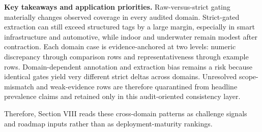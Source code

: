 \textbf{Key takeaways and application priorities.} Raw-versus-strict gating materially changes observed coverage in every audited domain. Strict-gated extraction can still exceed structured tags by a large margin, especially in smart infrastructure and automotive, while indoor and underwater remain modest after contraction. Each domain case is evidence-anchored at two levels: numeric discrepancy through comparison rows and representativeness through example rows. Domain-dependent annotation and extraction bias remains a risk because identical gates yield very different strict deltas across domains. Unresolved scope-mismatch and weak-evidence rows are therefore quarantined from headline prevalence claims and retained only in this audit-oriented consistency layer.

Therefore, Section VIII reads these cross-domain patterns as challenge signals and roadmap inputs rather than as deployment-maturity rankings.
